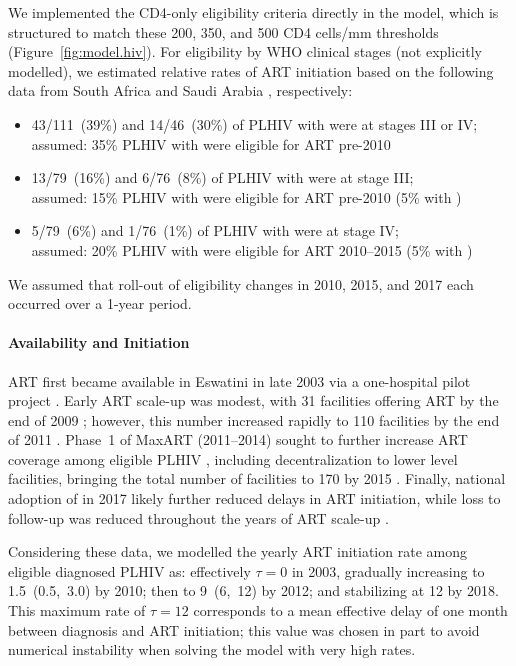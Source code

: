 \par
We implemented the CD4-only eligibility criteria directly in the model,
which is structured to match these 200, 350, and 500 CD4 cells/mm thresholds
(Figure~\ref{fig:model.hiv}).
For eligibility by WHO clinical stages (not explicitly modelled),
we estimated relative rates of ART initiation based on the following data from
South Africa \cite[Table~4]{Badri2004} and Saudi Arabia \cite[Table~2]{Edathodu2009}, respectively:
\begin{itemize}
  \item 43/111~(39\%) and 14/46~(30\%) of PLHIV with  were at stages III or IV;\\
        assumed: 35\% PLHIV with  were eligible for ART pre-2010
  \item 13/79~(16\%) and 6/76~(8\%) of PLHIV with  were at stage III;\\
        assumed: 15\% PLHIV with  were eligible for ART pre-2010
        (5\% with )
  \item 5/79~(6\%) and 1/76~(1\%) of PLHIV with  were at stage IV;\\
        assumed: 20\% PLHIV with  were eligible for ART 2010--2015
        (5\% with )
\end{itemize}
We assumed that roll-out of eligibility changes in 2010, 2015, and 2017
each occurred over a 1-year period.
\paragraph{Availability and Initiation}
ART first became available in Eswatini in late 2003
via a one-hospital pilot project \cite{NERCHA2012rep}.
Early ART scale-up was modest, with 31 facilities offering ART by the end of 2009 \cite{CDC2013art};
however, this number increased rapidly
to 110 facilities by the end of 2011 \cite{NERCHA2012rep}.
Phase~1 of MaxART (2011--2014) sought to
further increase ART coverage among eligible PLHIV \cite{MaxART1},
including decentralization to lower level facilities,
bringing the total number of facilities to 170 by 2015 \cite{EswMOH2015rep}.
Finally, national adoption of  in 2017
likely further reduced delays in ART initiation,
while loss to follow-up was reduced throughout the years of ART scale-up \cite{MaxART2}.
\par
Considering these data, we modelled the yearly ART initiation rate among eligible diagnosed PLHIV as:
effectively $\tau = 0$ in 2003, gradually increasing to 1.5~(0.5,~3.0) by 2010;
then to 9~(6,~12) by 2012; and stabilizing at 12 by 2018.
This maximum rate of $\tau = 12$ corresponds to
a mean effective delay of one month between diagnosis and ART initiation;
this value was chosen in part to avoid numerical instability
when solving the model with very high rates.
